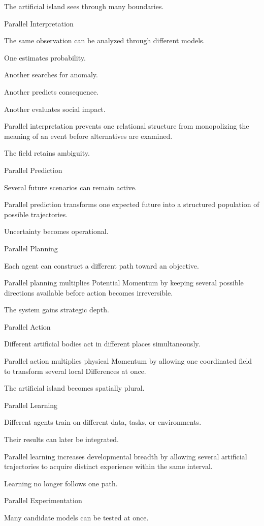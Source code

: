 The artificial island sees through many boundaries.

Parallel Interpretation

The same observation can be analyzed through different models.

One estimates probability.

Another searches for anomaly.

Another predicts consequence.

Another evaluates social impact.

Parallel interpretation prevents one relational structure from monopolizing the meaning of an event before alternatives are examined.

The field retains ambiguity.

Parallel Prediction

Several future scenarios can remain active.

Parallel prediction transforms one expected future into a structured population of possible trajectories.

Uncertainty becomes operational.

Parallel Planning

Each agent can construct a different path toward an objective.

Parallel planning multiplies Potential Momentum by keeping several possible directions available before action becomes irreversible.

The system gains strategic depth.

Parallel Action

Different artificial bodies act in different places simultaneously.

Parallel action multiplies physical Momentum by allowing one coordinated field to transform several local Differences at once.

The artificial island becomes spatially plural.

Parallel Learning

Different agents train on different data, tasks, or environments.

Their results can later be integrated.

Parallel learning increases developmental breadth by allowing several artificial trajectories to acquire distinct experience within the same interval.

Learning no longer follows one path.

Parallel Experimentation

Many candidate models can be tested at once.

